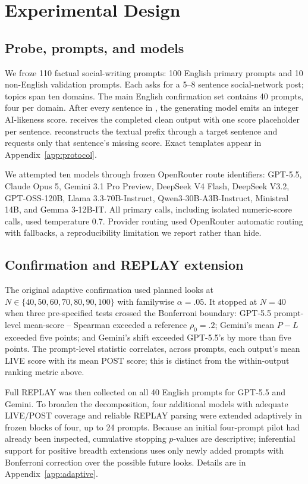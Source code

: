 \section{Experimental Design}
\subsection{Probe, prompts, and models}
We froze 110 factual social-writing prompts: 100 English primary prompts and 10 non-English validation prompts. Each asks for a 5--8 sentence social-network post; topics span ten domains. The main English confirmation set contains 40 prompts, four per domain. After every sentence in \live{}, the generating model emits an integer AI-likeness score. \post{} receives the completed clean output with one score placeholder per sentence. \replay{} reconstructs the textual prefix through a target sentence and requests only that sentence's missing score. Exact templates appear in Appendix~\ref{app:protocol}.

We attempted ten models through frozen OpenRouter route identifiers: GPT-5.5, Claude Opus 5, Gemini 3.1 Pro Preview, DeepSeek V4 Flash, DeepSeek V3.2, GPT-OSS-120B, Llama 3.3-70B-Instruct, Qwen3-30B-A3B-Instruct, Ministral 14B, and Gemma 3-12B-IT. All primary calls, including isolated numeric-score calls, used temperature 0.7. Provider routing used OpenRouter automatic routing with fallbacks, a reproducibility limitation we report rather than hide.

\subsection{Confirmation and REPLAY extension}
The original adaptive confirmation used planned looks at $N\in\{40,50,60,70,80,90,100\}$ with familywise $\alpha=.05$. It stopped at $N=40$ when three pre-specified tests crossed the Bonferroni boundary: GPT-5.5 prompt-level mean-score \live{}--\post{} Spearman exceeded a reference $\rho_0=.2$; Gemini's mean $P-L$ exceeded five points; and Gemini's shift exceeded GPT-5.5's by more than five points. The prompt-level statistic correlates, across prompts, each output's mean LIVE score with its mean POST score; this is distinct from the within-output ranking metric above.

Full REPLAY was then collected on all 40 English prompts for GPT-5.5 and Gemini. To broaden the decomposition, four additional models with adequate LIVE/POST coverage and reliable REPLAY parsing were extended adaptively in frozen blocks of four, up to 24 prompts. Because an initial four-prompt pilot had already been inspected, cumulative stopping $p$-values are descriptive; inferential support for positive breadth extensions uses only newly added prompts with Bonferroni correction over the possible future looks. Details are in Appendix~\ref{app:adaptive}.


